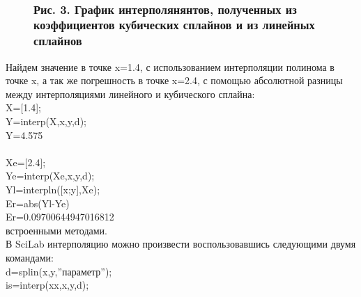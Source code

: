 \documentclass[russian,utf8,nocolumnxxxi,nocolumnxxxii]{eskdtext}
\begin{document}
\begin{figure}[H]
\begin{center}
\begin{minipage}[h]{0.70\linewidth}
  \\
\frametitle{Рис. 3. График интерполянянтов, полученных из коэффициентов кубических сплайнов и из линейных сплайнов}
\end{minipage}
\end{center}
\end{figure}
Найдем значение в точке x=1.4, с использованием интерполяции полинома в точке x, а так же погрешность в точке x=2.4, с помощью абсолютной разницы между интерполяциями линейного и кубического сплайна:\\
X=[1.4];\\
Y=interp(X,x,y,d);\\
Y=4.575\\
\\
Xe=[2.4];\\
Ye=interp(Xe,x,y,d);\\
Yl=interpln([x;y],Xe);\\
Er=abs(Yl-Ye)\\
Er=0.09700644947016812\\
\newpage
{ встроенными методами.}\\
В SciLab интерполяцию можно произвести воспользовавшись следующими двумя командами:\\
d=splin(x,y,”параметр”);\\
is=interp(xx,x,y,d);\\
\end{document}
